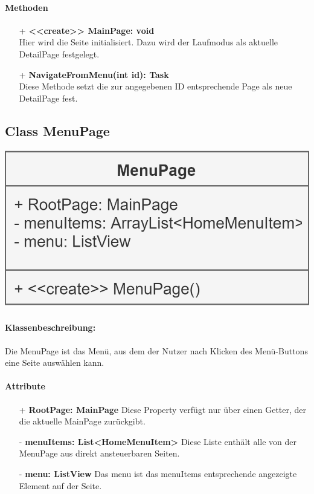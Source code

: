 \documentclass[a4paper,12pt]{article}
\begin{document}
		\paragraph{Methoden}
		\begin{itemize}
			\item [+] \textbf{<<create>> MainPage: void}\\ Hier wird die Seite initialisiert. Dazu wird der Laufmodus als aktuelle DetailPage festgelegt.
			\item [+] \textbf{NavigateFromMenu(int id): Task}\\ Diese Methode setzt die zur angegebenen ID entsprechende Page als neue DetailPage fest.
		\end{itemize}
	\begin{minipage}[b]{0.7\textwidth}

		\subsection{Class MenuPage}
	\end{minipage}
	\begin{minipage}[c]{0.3\textwidth}
		\includegraphics[width=\textwidth]{bilder/ViewKlassen/MenuPage.png}
	\end{minipage}
		\paragraph{Klassenbeschreibung:}
		Die MenuPage ist das Menü, aus dem der Nutzer nach Klicken des Menü-Buttons eine Seite auswählen kann.
		\paragraph{Attribute}
		\begin{itemize}
			\item [+] \textbf{RootPage: MainPage} Diese Property verfügt nur über einen Getter, der die aktuelle MainPage zurückgibt.
			\item [-] \textbf{menuItems: List<HomeMenuItem>} Diese Liste enthält alle von der MenuPage aus direkt ansteuerbaren Seiten.
			\item [-] \textbf{menu: ListView} Das menu ist das menuItems entsprechende angezeigte Element auf der Seite.		
		\end{itemize}
\end{document}
